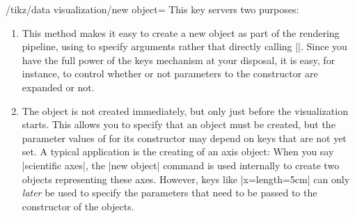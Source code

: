 \begin{key}{/tikz/data visualization/new object=}
  This key servers two purposes:
  \begin{enumerate}
  \item
    This method makes it easy to create a new object as part of the
    rendering pipeline, using  to specify arguments rather
    that directly calling |\pgfoonew|. Since you have the full power
    of the keys mechanism at your disposal, it is easy, for instance,
    to control whether or not parameters to the constructor are
    expanded or not.
  \item
    The object is not created immediately, but only just before the
    visualization starts. This allows you to specify that an object
    must be created, but the parameter values of for its constructor
    may depend on keys that are not yet set. A typical application is
    the creating of an axis object: When you say |scientific axes|,
    the |new object| command is used internally to create two
    objects representing these axes. However, keys like
    |x={length=5cm}| can only \emph{later} be used to specify the
    parameters that need to be passed to the constructor of the
    objects.
  \end{enumerate}


\end{key}
